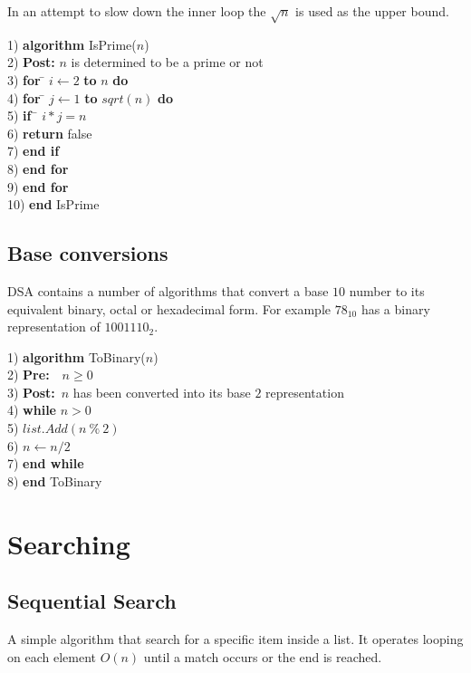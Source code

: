 \documentclass[10pt,oneside,a4paper]{report}
\begin{document}
In an attempt to slow down the inner loop the $\sqrt{n}$ is used as the upper bound.

\begin{tabbing}
1) \textbf{alg}\= \textbf{orithm} IsPrime($n$)\\
2) \> \textbf{Post:} $n$ is determined to be a prime or not \\
3) \> \textbf{for} \= $i \leftarrow 2$ \textbf{to} $n$ \textbf{do}\\
4) \> \> \textbf{for} \= $j \leftarrow 1$ \textbf{to} $sqrt(n)$ \textbf{do}\\
5) \> \> \> \textbf{if}~\= $i * j = n$\\
6) \> \> \> \> \textbf{return} false\\
7) \> \> \> \textbf{end if}\\
8) \> \> \textbf{end for}\\	
9) \> \textbf{end for}\\
10) \textbf{end} IsPrime
\end{tabbing}

\section{Base conversions}
DSA contains a number of algorithms that convert a base $10$ number to its equivalent binary, octal or hexadecimal form. For example $78_{10}$ has a binary representation of $1001110_{2}$.

\begin{tabbing}
1) \textbf{alg}\= \textbf{orithm} ToBinary($n$)\\
2) \> \textbf{Pre:}~~$n \geq 0$ \\
3) \> \textbf{Post:}~$n$ has been converted into its base $2$ representation \\
4) \> \textbf{whi}\= \textbf{le} $n > 0$\\
5) \> \> $list.Add(n~\%~2)$\\
6) \> \> $n \leftarrow n / 2$\\
7) \> \textbf{end while}\\
8) \textbf{end} ToBinary\\
\end{tabbing}

\chapter{Searching}

\section{Sequential Search}
A simple algorithm that search for a specific item inside a list. It operates looping on each element $O(n)$ until a match occurs or the end is reached.
\end{document}
